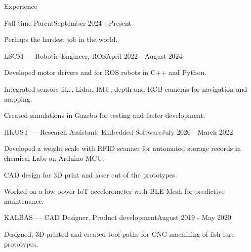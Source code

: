 \documentclass[
	a4paper, %
	11pt, %
]{resume} %
\begin{document}
\begin{rSection}{Experience}

	\begin{rSubsection}{Full time Parent}{September 2024 - Present}{}{}
		\item Perhaps the hardest job in the world.
	\end{rSubsection}


	\begin{rSubsection}{LSCM --- Robotic Engineer, ROS}{April 2022 - August 2024}{}{}
		\item Developed motor drivers and for ROS robots in C++ and Python.
		\item Integrated sensors like, Lidar, IMU, depth and RGB cameras for navigation and mapping.
		\item Created simulations in Gazebo for testing and faster development.
	\end{rSubsection}


	\begin{rSubsection}{HKUST --- Research Assistant, Embedded Software}{July 2020 - March 2022}{}{}
		\item Developed a weight scale with RFID scanner for automated storage records in chemical Labs on Arduino MCU.
		\item CAD design for 3D print and laser cut of the prototypes.
		\item Worked on a low power IoT accelerometer with BLE Mesh for predictive maintenance.
	\end{rSubsection}


	\begin{rSubsection}{KALBAS --- CAD Designer, Product development}{August 2019 - May 2020}{}{}
		\item Designed, 3D-printed and created tool-paths for CNC machining of fish lure prototypes.
	\end{rSubsection}

\end{rSection}


\end{document}
